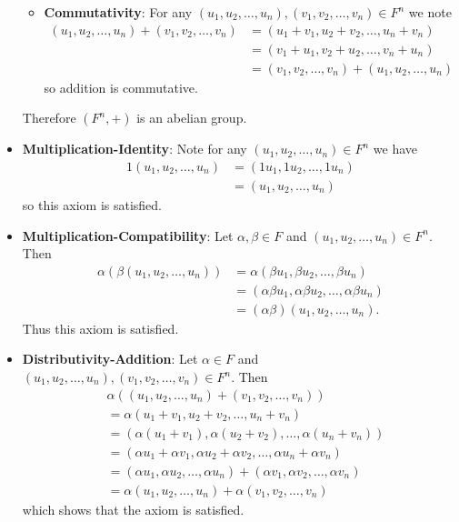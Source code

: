 \begin{questions}
\begin{itemize}
\begin{itemize}
            \item \textbf{Commutativity}: For any $(u_1, u_2, \dots, u_n), (v_1, v_2, \dots, v_n) \in F^n$ we note
            \begin{align*}
                (u_1, u_2, \dots, u_n) + (v_1, v_2, \dots, v_n) &= (u_1 + v_1, u_2 + v_2, \dots, u_n + v_n)\\
                &= (v_1 + u_1, v_2 + u_2, \dots, v_n + u_n)\\
                &= (v_1, v_2, \dots, v_n) + (u_1, u_2, \dots, u_n)
            \end{align*}
            so addition is commutative.
        \end{itemize}
        Therefore $(F^n, +)$ is an abelian group.
        
        \item \textbf{Multiplication-Identity}: Note for any $(u_1, u_2, \dots, u_n) \in F^n$ we have
        \begin{align*}
            1(u_1, u_2, \dots, u_n) &= (1u_1, 1u_2, \dots, 1u_n)\\
            &= (u_1, u_2, \dots, u_n)
        \end{align*}
        so this axiom is satisfied.

        \item \textbf{Multiplication-Compatibility}: Let $\alpha, \beta \in F$ and $(u_1, u_2, \dots, u_n) \in F^n$. Then
        \begin{align*}
            \alpha(\beta(u_1, u_2, \dots, u_n)) &= \alpha(\beta u_1, \beta u_2, \dots, \beta u_n)\\
            &= (\alpha\beta u_1, \alpha\beta u_2, \dots, \alpha\beta u_n)\\
            &= (\alpha\beta)(u_1, u_2, \dots, u_n).
        \end{align*}
        Thus this axiom is satisfied.
        
        \item \textbf{Distributivity-Addition}: Let $\alpha \in F$ and $(u_1, u_2, \dots, u_n), (v_1, v_2, \dots, v_n) \in F^n$. Then
        \begin{align*}
            &\alpha((u_1, u_2, \dots, u_n) + (v_1, v_2, \dots, v_n))\\
            &= \alpha(u_1 + v_1, u_2 + v_2, \dots, u_n + v_n)\\
            &= (\alpha(u_1 + v_1), \alpha(u_2 + v_2), \dots, \alpha(u_n + v_n))\\
            &= (\alpha u_1 + \alpha v_1, \alpha u_2 + \alpha v_2, \dots, \alpha u_n + \alpha v_n)\\
            &= (\alpha u_1, \alpha u_2, \dots, \alpha u_n) + (\alpha v_1, \alpha v_2, \dots, \alpha v_n)\\
            &= \alpha(u_1, u_2, \dots, u_n) + \alpha(v_1, v_2, \dots, v_n)
        \end{align*}
        which shows that the axiom is satisfied.
        

\end{itemize}
\end{questions}
